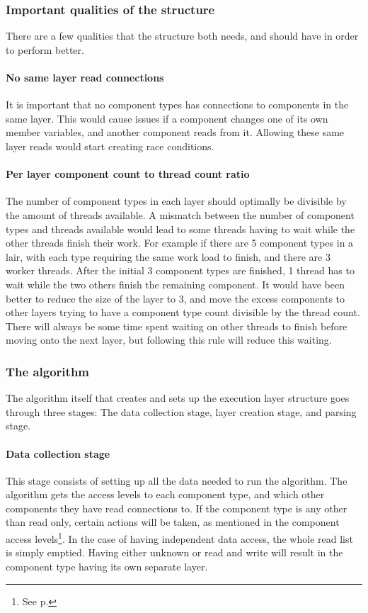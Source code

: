 \subsubsection{Important qualities of the structure}
There are a few qualities that the structure both needs, and should have in order to perform better.

\paragraph{No same layer read connections}
It is important that no component types has connections to components in the same layer.
This would cause issues if a component changes one of its own member variables, and another component reads from it.
Allowing these same layer reads would start creating race conditions.

\paragraph{Per layer component count to thread count ratio}
The number of component types in each layer should optimally be divisible by the amount of threads available.
A mismatch between the number of component types and threads available would lead to some threads having to wait while the other threads finish their work.
For example if there are 5 component types in a lair, with each type requiring the same work load to finish, and there are 3 worker threads.
After the initial 3 component types are finished, 1 thread has to wait while the two others finish the remaining component.
It would have been better to reduce the size of the layer to 3, and move the excess components to other layers trying to have a component type count divisible by the thread count.
There will always be some time spent waiting on other threads to finish before moving onto the next layer, but following this rule will reduce this waiting.

\subsubsection{The algorithm}
The algorithm itself that creates and sets up the execution layer structure goes through three stages: The data collection stage, layer creation stage, and parsing stage.

\paragraph{Data collection stage}
This stage consists of setting up all the data needed to run the algorithm.
The algorithm gets the access levels to each component type, and which other components they have read connections to.
If the component type is any other than read only, certain actions will be taken, as mentioned in the component access levels\footnote{See p.\pageref{subsec:detailed_component_access_levels}}.
In the case of having independent data access, the whole read list is simply emptied.
Having either unknown or read and write will result in the component type having its own separate layer.


